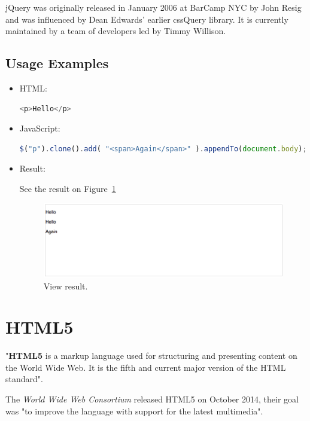 \documentclass[a4paper, 12pt, english]{book}
\begin{document}
    jQuery was originally released in January 2006 at BarCamp NYC by John Resig and was influenced by Dean Edwards' earlier cssQuery library. It is currently maintained by a team of developers led by Timmy Willison.

\subsection{Usage Examples}
\label{sec:jquery-examples}
\begin{itemize}
    \item HTML:
        \begin{lstlisting}[language=javascript]
<p>Hello</p>
        \end{lstlisting}
    \item JavaScript:
        \begin{lstlisting}[language=javascript]
$("p").clone().add( "<span>Again</span>" ).appendTo(document.body);
        \end{lstlisting}
    \item Result:

    See the result on Figure~\ref{fig:jquery-result-example}
        \begin{figure}
          \centering
          \includegraphics[width=13cm, keepaspectratio]{img/jquery-result-example}
          \caption{View result.}
          \label{fig:jquery-result-example}
        \end{figure}
\end{itemize}


\section{HTML5}
\label{sec:html5}

"\textbf{HTML5} is a markup language used for structuring and presenting content on the World Wide Web. It is the fifth and current major version of the HTML standard".

The \textit{World Wide Web Consortium} released HTML5 on October 2014, their goal was "to improve the language with support for the latest multimedia".
\end{document}
